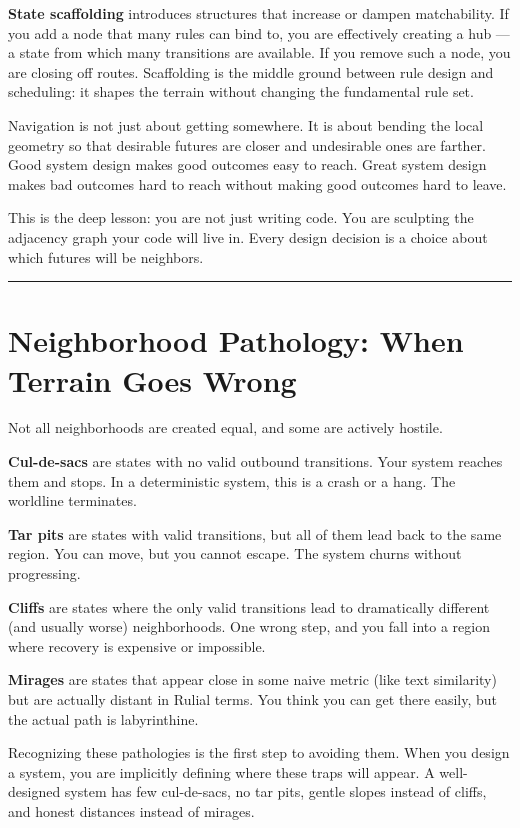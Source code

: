\textbf{State scaffolding} introduces structures that increase or dampen matchability. If you add a node that many rules can bind to, you are effectively creating a hub --- a state from which many transitions are available. If you remove such a node, you are closing off routes. Scaffolding is the middle ground between rule design and scheduling: it shapes the terrain without changing the fundamental rule set.

Navigation is not just about getting somewhere. It is about bending the local geometry so that desirable futures are closer and undesirable ones are farther. Good system design makes good outcomes easy to reach. Great system design makes bad outcomes hard to reach without making good outcomes hard to leave.

This is the deep lesson: you are not just writing code. You are sculpting the adjacency graph your code will live in. Every design decision is a choice about which futures will be neighbors.

\begin{center}\rule{0.5\linewidth}{0.5pt}\end{center}

\section{Neighborhood Pathology: When Terrain Goes Wrong}
\label{7.6-neighborhood-pathology}

Not all neighborhoods are created equal, and some are actively hostile.

\textbf{Cul-de-sacs} are states with no valid outbound transitions. Your system reaches them and stops. In a deterministic system, this is a crash or a hang. The worldline terminates.

\textbf{Tar pits} are states with valid transitions, but all of them lead back to the same region. You can move, but you cannot escape. The system churns without progressing.

\textbf{Cliffs} are states where the only valid transitions lead to dramatically different (and usually worse) neighborhoods. One wrong step, and you fall into a region where recovery is expensive or impossible.

\textbf{Mirages} are states that appear close in some naive metric (like text similarity) but are actually distant in Rulial terms. You think you can get there easily, but the actual path is labyrinthine.

Recognizing these pathologies is the first step to avoiding them. When you design a system, you are implicitly defining where these traps will appear. A well-designed system has few cul-de-sacs, no tar pits, gentle slopes instead of cliffs, and honest distances instead of mirages.

